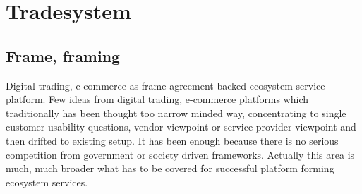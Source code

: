 %
%
%

\part{Tradesystem}
\label{tradesystem}
\chapter{Frame, framing}
\label{frame_framing}

Digital trading, e-commerce as frame agreement backed ecosystem service platform.
Few ideas from digital trading, e-com\-mer\-ce platforms which traditionally has been thought too narrow mind\-ed way, concentrating to single customer usability questions, vendor viewpoint or service provider viewpoint and then drifted to existing setup. It has been enough because there is no serious competition from government or society driven frameworks. Actually this area is much, much broader what has to be covered for successful platform forming ecosystem services.


